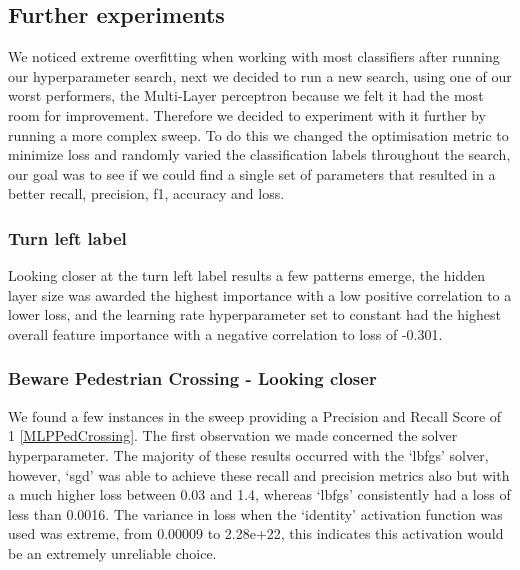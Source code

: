 \documentclass[11pt]{article}
\begin{document}
\subsection{Further experiments}

We noticed extreme overfitting when working with most classifiers after running our hyperparameter search, next we decided to run a new search, using one of our worst performers, the Multi-Layer perceptron because we felt it had the most room for improvement. Therefore we decided to experiment with it further by running a more complex sweep.
To do this we changed the optimisation metric to minimize loss and randomly varied the classification labels throughout the search, our goal was to see if we could find a single set of parameters that resulted in a better recall, precision, f1, accuracy and loss.

\subsubsection{Turn left label}
Looking closer at the turn left label results a few patterns emerge, the hidden layer size was awarded the highest importance with a low positive correlation to a lower loss, and the learning rate hyperparameter set to constant had the highest overall feature importance with a negative correlation to loss of -0.301.


\subsubsection{Beware Pedestrian Crossing - Looking closer}
We found a few instances in the sweep providing a Precision and Recall Score of 1 \ref{MLPPedCrossing}. The first observation we made concerned the solver hyperparameter. The majority of these results occurred with the ‘lbfgs’ solver, however, ‘sgd’ was able to achieve these recall and precision metrics also but with a much higher loss between 0.03 and 1.4, whereas ‘lbfgs’ consistently had a loss of less than 0.0016.
The variance in loss when the ‘identity’ activation function was used was extreme, from 0.00009 to 2.28e+22, this indicates this activation would be an extremely unreliable choice. 
\end{document}
